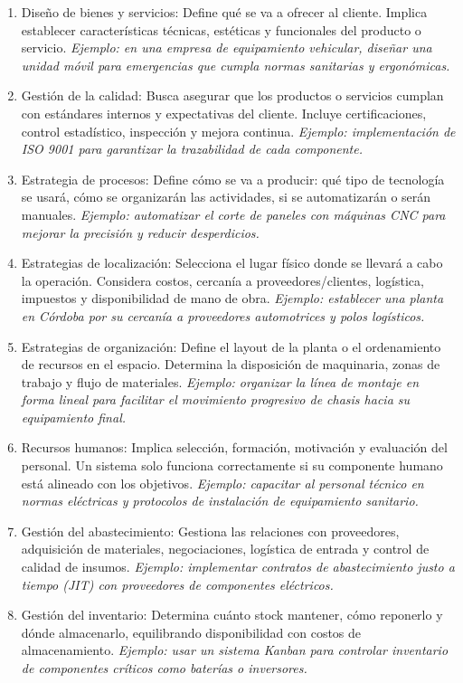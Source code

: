 \documentclass[a4paper,oneside,11pt]{article}
\begin{document}
\begin{enumerate}
    \item Diseño de bienes y servicios: Define qué se va a ofrecer al cliente. Implica establecer características técnicas, estéticas y funcionales del producto o servicio. \textit{Ejemplo: en una empresa de equipamiento vehicular, diseñar una unidad móvil para emergencias que cumpla normas sanitarias y ergonómicas.}
    \item Gestión de la calidad: Busca asegurar que los productos o servicios cumplan con estándares internos y expectativas del cliente. Incluye certificaciones, control estadístico, inspección y mejora continua. \textit{Ejemplo: implementación de ISO 9001 para garantizar la trazabilidad de cada componente.}
    \item Estrategia de procesos: Define cómo se va a producir: qué tipo de tecnología se usará, cómo se organizarán las actividades, si se automatizarán o serán manuales. \textit{Ejemplo: automatizar el corte de paneles con máquinas CNC para mejorar la precisión y reducir desperdicios.}
    \item Estrategias de localización: Selecciona el lugar físico donde se llevará a cabo la operación. Considera costos, cercanía a proveedores/clientes, logística, impuestos y disponibilidad de mano de obra. \textit{Ejemplo: establecer una planta en Córdoba por su cercanía a proveedores automotrices y polos logísticos.}
    \item Estrategias de organización: Define el layout de la planta o el ordenamiento de recursos en el espacio. Determina la disposición de maquinaria, zonas de trabajo y flujo de materiales. \textit{Ejemplo: organizar la línea de montaje en forma lineal para facilitar el movimiento progresivo de chasis hacia su equipamiento final.}
    \item Recursos humanos: Implica selección, formación, motivación y evaluación del personal. Un sistema solo funciona correctamente si su componente humano está alineado con los objetivos. \textit{Ejemplo: capacitar al personal técnico en normas eléctricas y protocolos de instalación de equipamiento sanitario.}
    \item Gestión del abastecimiento: Gestiona las relaciones con proveedores, adquisición de materiales, negociaciones, logística de entrada y control de calidad de insumos. \textit{Ejemplo: implementar contratos de abastecimiento justo a tiempo (JIT) con proveedores de componentes eléctricos.}
    \item Gestión del inventario: Determina cuánto stock mantener, cómo reponerlo y dónde almacenarlo, equilibrando disponibilidad con costos de almacenamiento. \textit{Ejemplo: usar un sistema Kanban para controlar inventario de componentes críticos como baterías o inversores.}

\end{enumerate}
\end{document}
